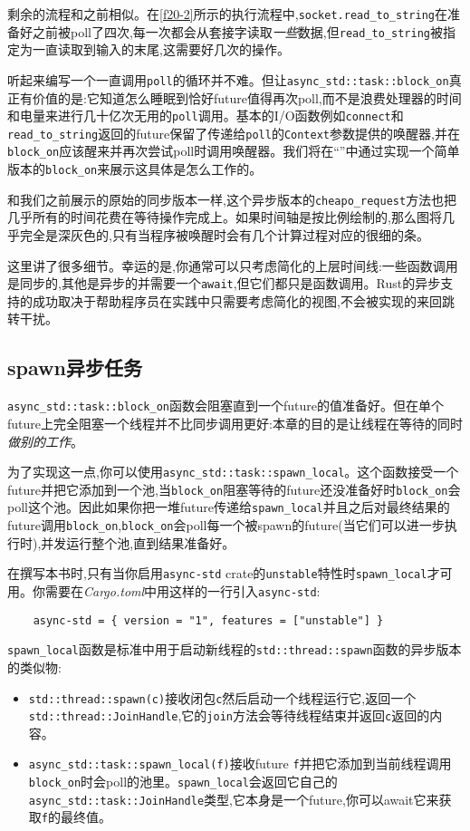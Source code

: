 剩余的流程和之前相似。在\autoref{f20-2}所示的执行流程中,\texttt{socket.read\_to\_string}在准备好之前被poll了四次,每一次都会从套接字读取\emph{一些}数据,但\texttt{read\_to\_string}被指定为一直读取到输入的末尾,这需要好几次的操作。

听起来编写一个一直调用\texttt{poll}的循环并不难。但让\texttt{async\_std::task::block\_on}真正有价值的是:它知道怎么睡眠到恰好future值得再次poll,而不是浪费处理器的时间和电量来进行几十亿次无用的\texttt{poll}调用。基本的I/O函数例如\texttt{connect}和\texttt{read\_to\_string}返回的future保留了传递给\texttt{poll}的\texttt{Context}参数提供的唤醒器,并在\texttt{block\_on}应该醒来并再次尝试poll时调用唤醒器。我们将在“”中通过实现一个简单版本的\texttt{block\_on}来展示这具体是怎么工作的。

和我们之前展示的原始的同步版本一样,这个异步版本的\texttt{cheapo\_request}方法也把几乎所有的时间花费在等待操作完成上。如果时间轴是按比例绘制的,那么图将几乎完全是深灰色的,只有当程序被唤醒时会有几个计算过程对应的很细的条。

这里讲了很多细节。幸运的是,你通常可以只考虑简化的上层时间线:一些函数调用是同步的,其他是异步的并需要一个\texttt{await},但它们都只是函数调用。Rust的异步支持的成功取决于帮助程序员在实践中只需要考虑简化的视图,不会被实现的来回跳转干扰。

\subsection{spawn异步任务}
\texttt{async\_std::task::block\_on}函数会阻塞直到一个future的值准备好。但在单个future上完全阻塞一个线程并不比同步调用更好:本章的目的是让线程在等待的同时\emph{做别的工作}。

为了实现这一点,你可以使用\texttt{async\_std::task::spawn\_local}。这个函数接受一个future并把它添加到一个池,当\texttt{block\_on}阻塞等待的future还没准备好时\texttt{block\_on}会poll这个池。因此如果你把一堆future传递给\texttt{spawn\_local}并且之后对最终结果的future调用\texttt{block\_on},\texttt{block\_on}会poll每一个被spawn的future(当它们可以进一步执行时),并发运行整个池,直到结果准备好。

在撰写本书时,只有当你启用\texttt{async-std} crate的\texttt{unstable}特性时\texttt{spawn\_local}才可用。你需要在\emph{Cargo.toml}中用这样的一行引入\texttt{async-std}:
\begin{verbatim}
    async-std = { version = "1", features = ["unstable"] }
\end{verbatim}

\texttt{spawn\_local}函数是标准中用于启动新线程的\texttt{std::thread::spawn}函数的异步版本的类似物:
\begin{itemize}
    \item \texttt{std::thread::spawn(c)}接收闭包\texttt{c}然后启动一个线程运行它,返回一个\texttt{std::thread::JoinHandle},它的\texttt{join}方法会等待线程结束并返回\texttt{c}返回的内容。
    \item \texttt{async\_std::task::spawn\_local(f)}接收future \texttt{f}并把它添加到当前线程调用\texttt{block\_on}时会poll的池里。\texttt{spawn\_local}会返回它自己的\texttt{async\_std::task::JoinHandle}类型,它本身是一个future,你可以await它来获取\texttt{f}的最终值。
\end{itemize}

